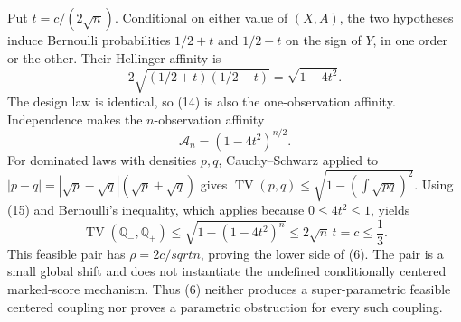 Put \(t=c/(2\sqrt n)\).  Conditional on either value of \((X,A)\), the two hypotheses induce Bernoulli probabilities \(1/2+t\) and \(1/2-t\) on the sign of \(Y\), in one order or the other.  Their Hellinger affinity is
\[
 2\sqrt{(1/2+t)(1/2-t)}=\sqrt{1-4t^2}.                                \tag{14}
\]
The design law is identical, so (14) is also the one-observation affinity.  Independence makes the \(n\)-observation affinity
\[
 \mathcal A_n=(1-4t^2)^{n/2}.                                         \tag{15}
\]
For dominated laws with densities \(p,q\), Cauchy--Schwarz applied to \(|p-q|=|\sqrt p-\sqrt q|(\sqrt p+\sqrt q)\) gives \(\operatorname{TV}(p,q)\le\sqrt{1-(\int\sqrt{pq})^2}\).  Using (15) and Bernoulli's inequality, which applies because \(0\le4t^2\le1\), yields
\[
 \operatorname{TV}(\mathbb Q_{-},\mathbb Q_{+})
 \le\sqrt{1-(1-4t^2)^n}
 \le2\sqrt n\,t=c\le\frac13.                                      \tag{16}
\]
This feasible pair has \(\rho=2c/sqrt n\), proving the lower side of (6).  The pair is a small global shift and does not instantiate the undefined conditionally centered marked-score mechanism.  Thus (6) neither produces a super-parametric feasible centered coupling nor proves a parametric obstruction for every such coupling.
